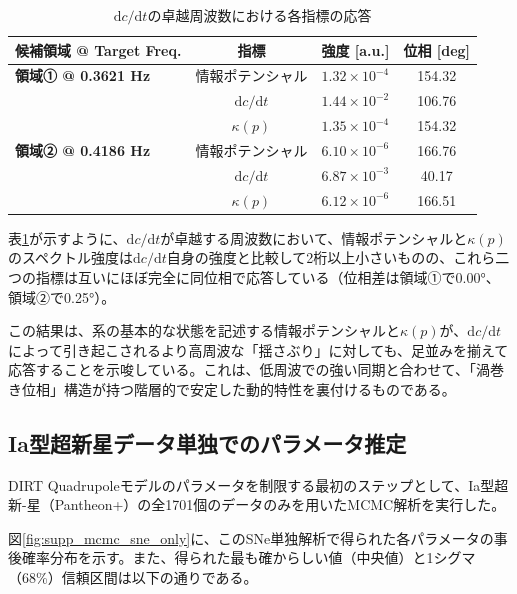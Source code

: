 \documentclass[a4paper,12pt]{article}
\begin{document}
\begin{table}[H]
    \centering
    \caption{$\mathrm{d}c/\mathrm{d}t$の卓越周波数における各指標の応答}
    \label{tab:supp_fft_re_results}
    \begin{tabular}{@{}lccc@{}}
        \toprule
        \textbf{候補領域 @ Target Freq.} & \textbf{指標} & \textbf{強度 [a.u.]} & \textbf{位相 [deg]} \\
        \midrule
        \textbf{領域① @ 0.3621 Hz} & 情報ポテンシャル & $1.32 \times 10^{-4}$ & 154.32 \\
                         & $\mathrm{d}c/\mathrm{d}t$ & $1.44 \times 10^{-2}$ & 106.76 \\
                         & $\kappa(p)$ & $1.35 \times 10^{-4}$ & 154.32 \\
        \midrule
        \textbf{領域② @ 0.4186 Hz} & 情報ポテンシャル & $6.10 \times 10^{-6}$ & 166.76 \\
                         & $\mathrm{d}c/\mathrm{d}t$ & $6.87 \times 10^{-3}$ & 40.17 \\
                         & $\kappa(p)$ & $6.12 \times 10^{-6}$ & 166.51 \\
        \bottomrule
    \end{tabular}
\end{table}

表\ref{tab:supp_fft_re_results}が示すように、$\mathrm{d}c/\mathrm{d}t$が卓越する周波数において、情報ポテンシャルと$\kappa(p)$のスペクトル強度は$\mathrm{d}c/\mathrm{d}t$自身の強度と比較して2桁以上小さいものの、これら二つの指標は互いにほぼ完全に同位相で応答している（位相差は領域①で0.00°、領域②で0.25°）。

この結果は、系の基本的な状態を記述する情報ポテンシャルと$\kappa(p)$が、$\mathrm{d}c/\mathrm{d}t$によって引き起こされるより高周波な「揺さぶり」に対しても、足並みを揃えて応答することを示唆している。これは、低周波での強い同期と合わせて、「渦巻き位相」構造が持つ階層的で安定した動的特性を裏付けるものである。

\subsection{Ia型超新星データ単独でのパラメータ推定}
\label{subsec:supp_sne_only_fit}

DIRT Quadrupoleモデルのパラメータを制限する最初のステップとして、Ia型超新-星（Pantheon+）の全1701個のデータのみを用いたMCMC解析を実行した。

図\ref{fig:supp_mcmc_sne_only}に、このSNe単独解析で得られた各パラメータの事後確率分布を示す。また、得られた最も確からしい値（中央値）と1シグマ（68\%）信頼区間は以下の通りである。
\end{document}
